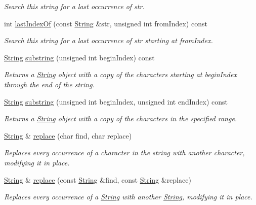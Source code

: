 \begin{DoxyCompactItemize}
\begin{DoxyCompactList}\small\item\em Search this string for a last occurrence of str. \end{DoxyCompactList}\item 
int \hyperlink{class_string_a08e7c60202cc42fe4731b52c0c5cd80f}{last\+Index\+Of} (const \hyperlink{class_string}{String} \&str, unsigned int from\+Index) const
\begin{DoxyCompactList}\small\item\em Search this string for a last occurrence of str starting at from\+Index. \end{DoxyCompactList}\item 
\hyperlink{class_string}{String} \hyperlink{class_string_a36b10b81c1556de6e5c63fd060347f30}{substring} (unsigned int begin\+Index) const
\begin{DoxyCompactList}\small\item\em Returns a \hyperlink{class_string}{String} object with a copy of the characters starting at begin\+Index through the end of the string. \end{DoxyCompactList}\item 
\hyperlink{class_string}{String} \hyperlink{class_string_ad04cc1c85089951dc3a182b4397a9f40}{substring} (unsigned int begin\+Index, unsigned int end\+Index) const
\begin{DoxyCompactList}\small\item\em Returns a \hyperlink{class_string}{String} object with a copy of the characters in the specified range. \end{DoxyCompactList}\item 
\hyperlink{class_string}{String} \& \hyperlink{class_string_a06f5fff85fe14f6369811383d915ca1a}{replace} (char find, char replace)
\begin{DoxyCompactList}\small\item\em Replaces every occurrence of a character in the string with another character, modifying it in place. \end{DoxyCompactList}\item 
\hyperlink{class_string}{String} \& \hyperlink{class_string_ad87b4e7c4d06d6fee95c5caa21b6ca83}{replace} (const \hyperlink{class_string}{String} \&find, const \hyperlink{class_string}{String} \&replace)
\begin{DoxyCompactList}\small\item\em Replaces every occurrence of a \hyperlink{class_string}{String} with another \hyperlink{class_string}{String}, modifying it in place. \end{DoxyCompactList}\item 

\end{DoxyCompactItemize}
